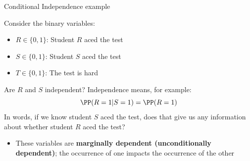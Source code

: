 \documentclass[compress, 8pt]{beamer}
\begin{document}
\begin{frame}{Conditional Independence example}

Consider the binary variables:
\begin{itemize}
    \item $R \in \{0, 1\}$: Student $R$ aced the test
    \item $S \in \{0, 1\}$: Student $S$ aced the test
    \item $T \in \{0, 1\}$: The test is hard
\end{itemize}
    
\begin{figure}
\end{figure}

Are $R$ and $S$ independent? Independence means, for example:
\begin{equation*}
    \PP (R = 1\vert S=1) = \PP (R = 1)
\end{equation*}
In words, if we know student $S$ aced the test, does that give us any information about whether student $R$ aced the test?

\pause
\begin{itemize}
    \item These variables are \textbf{marginally dependent (unconditionally dependent)}; the occurrence of one impacts the occurrence of the other
\end{itemize}

\end{frame}
\end{document}

